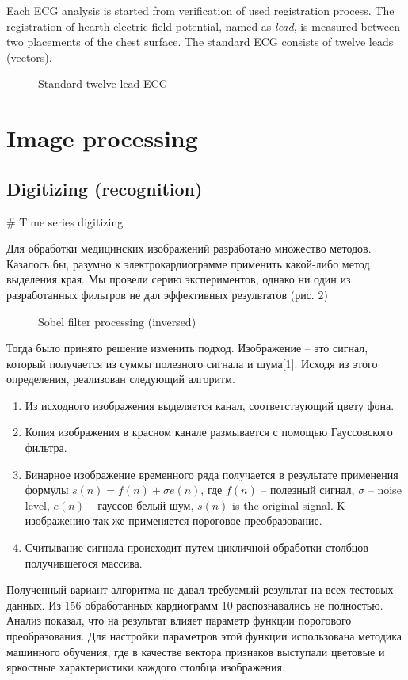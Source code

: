 \documentclass[runningheads]{AIIT}
\begin{document}
Each ECG analysis is started from verification of used registration process.  The registration of hearth electric field potential, named as \emph{lead}, is measured between two placements of the chest surface.  The standard ECG consists of twelve leads (vectors).

\begin{figure}[htb]
  \centering

  \caption{Standard twelve-lead ECG}
  \label{fig:leads-ex}
\end{figure}

\section{Image processing}
\label{sec:image-processing}

\subsection{Digitizing (recognition)}
\label{sec:digit-recogn}

# Time series digitizing

Для обработки медицинских изображений разработано множество методов. Казалось бы, разумно к электрокардиограмме применить какой-либо метод выделения края. Мы провели серию экспериментов, однако ни один из разработанных фильтров не дал эффективных результатов (рис. 2)


\begin{figure}[htb]
  \centering

  \caption{Sobel filter processing (inversed)}
  \label{fig:sobel-ex}
\end{figure}

Тогда было принято решение изменить подход. Изображение – это сигнал, который получается из суммы полезного сигнала и шума[1]. Исходя из этого определения, реализован следующий алгоритм.
\begin{enumerate}
\item Из исходного изображения выделяется канал, соответствующий
  цвету фона.
\item Копия изображения в красном канале размывается с
  помощью Гауссовского фильтра.
\item Бинарное изображение временного
  ряда получается в результате применения формулы
  $s(n)=f(n)+\sigma e(n)$, где $f(n)$ – полезный сигнал, $\sigma$ –
  noise level, $e(n)$ – гауссов белый шум, $s(n)$ is the original
  signal.  К изображению так же применяется пороговое преобразование.
\item Считывание сигнала происходит путем цикличной обработки столбцов
  получившегося массива.
\end{enumerate}
Полученный вариант алгоритма не давал требуемый результат на всех тестовых данных. Из 156 обработанных кардиограмм 10 распознавались не полностью. Анализ показал, что на результат влияет параметр функции порогового преобразования. Для настройки параметров этой функции использована методика машинного обучения, где в качестве вектора признаков выступали цветовые и яркостные характеристики каждого столбца изображения.
\end{document}
